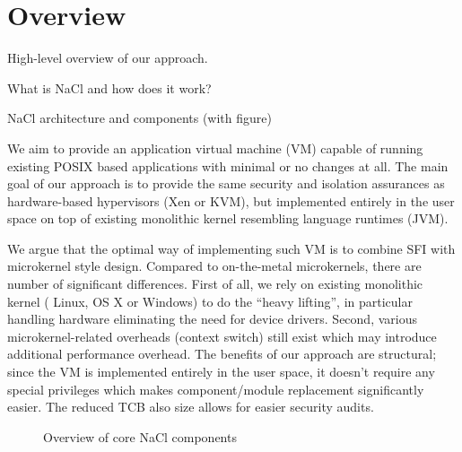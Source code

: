\section{Overview}
\label{sec:overview}

\begin{structure}
\item High-level overview of our approach.
\item What is NaCl and how does it work?
\item NaCl architecture and components (with figure)
\end{structure}


We aim to provide an application virtual machine (VM) capable of running
existing POSIX based applications with minimal or no changes at all. The
main goal of our approach is to provide the same security and isolation
assurances as hardware-based hypervisors (\eg Xen or KVM), but
implemented entirely in the user space on top of existing monolithic
kernel resembling language runtimes (\eg JVM).


We argue that the optimal way of implementing such VM is to combine SFI
with microkernel style design.
Compared to on-the-metal microkernels, there are number of significant
differences. First of all, we rely on existing monolithic kernel (\ie
Linux, OS X or Windows) to do the ``heavy lifting'', in particular
handling hardware eliminating the need for device drivers. Second,
various microkernel-related overheads (\eg context switch) still exist
which may introduce additional performance overhead. The benefits of our
approach are structural; since the VM is implemented entirely in the
user space, it doesn't require any special privileges which makes
component/module replacement significantly easier. The reduced TCB also
size allows for easier security audits.

\begin{figure}
\centering
\caption{Overview of core NaCl components}
\label{fig:architecture}
\end{figure}


